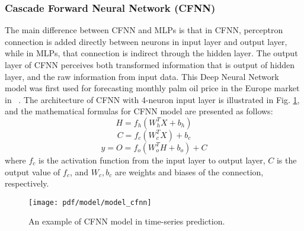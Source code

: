 \documentclass[../main.tex]{subfiles}
\begin{document}
\subsubsection{Cascade Forward Neural Network (CFNN)}
\label{model_cfnn}

The main difference between CFNN and MLPs is that in CFNN, perceptron connection is added directly between neurons in input layer and output layer, while in MLPs, that connection is indirect through the hidden layer. The output layer of CFNN perceives both transformed information that is output of hidden layer, and the raw information from input data. This Deep Neural Network model was first used for forecasting monthly palm oil price in the Europe market in ~\cite{warsito2018cascade}. The architecture of CFNN with 4-neuron input layer is illustrated in Fig. \ref{fig_model_cfnn}, and the mathematical formulas for CFNN model are presented as follows:
\begin{equation}\label{eq_cfnn_1}
H = f_h(W_h^TX + b_h)
\end{equation}
\begin{equation}\label{eq_cfnn_2}
C = f_c(W_c^TX) + b_c
\end{equation}
\begin{equation}\label{eq_cfnn_3}
y = O = f_o(W_o^TH + b_o) + C
\end{equation} 
where $f_c$ is the activation function from the input layer to output layer, $C$ is the output value of $f_c$, and $W_c, b_c$ are weights and biases of the connection, respectively.

\begin{figure}[!ht] 
   \centering
   \texttt{[image: pdf/model/model\_cfnn]}
  \caption{An example of CFNN model in time-series prediction.} 
  \label{fig_model_cfnn} 
\end{figure}
\end{document}
